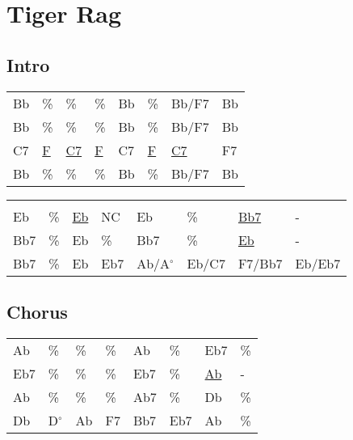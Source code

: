 \section{Tiger Rag}


\subsection*{Intro}


\begin{tabular}{l l l l l l l l}
Bb & \% & \% & \% & Bb & \% & Bb/F7 & Bb \\ 
Bb & \% & \% & \% & Bb & \% & Bb/F7 & Bb \\ 
C7 & \underline{F} & \underline{C7} & \underline{F} & C7 & \underline{F} & \underline{C7} & F7 \\ 
Bb & \% & \% & \% & Bb & \% & Bb/F7 & Bb \\ 
\end{tabular}


\begin{tabular}{l l l l l l l l}
\\ \\ 
Eb & \% & \underline{Eb} & NC & Eb & \% & \underline{Bb7} & - \\ 
Bb7 & \% & Eb & \% & Bb7 & \% & \underline{Eb} & - \\ 
Bb7 & \% & Eb & Eb7 & Ab/A$^{\circ}$ & Eb/C7 & F7/Bb7 & Eb/Eb7 \\ 
\end{tabular}


\subsection*{Chorus}


\begin{tabular}{l l l l l l l l}
Ab & \% & \% & \% & Ab & \% & Eb7 & \% \\ 
Eb7 & \% & \% & \% & Eb7 & \% & \underline{Ab} & - \\ 
Ab & \% & \% & \% & Ab7 & \% & Db & \% \\ 
Db & D$^{\circ}$ & Ab & F7 & Bb7 & Eb7 & Ab & \% \\ 
\end{tabular}

